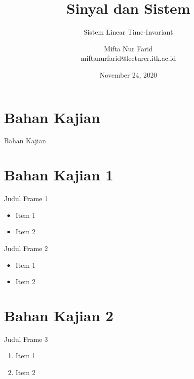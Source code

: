 \documentclass[aspectratio=169]{beamer}
\author{Mifta Nur Farid \\
	miftanurfarid@lecturer.itk.ac.id}
\title{Sinyal dan Sistem}
\subtitle{Sistem Linear Time-Invariant}
\institute{Teknik Elektro \\ Institut Teknologi Kalimantan \\ Balikpapan, Indonesia}
\date{\tiny November 24, 2020}
\begin{document}
\begin{frame}[t,plain]
\titlepage
\end{frame}

\section{Bahan Kajian}
\begin{frame}{Bahan Kajian}
		\tableofcontents[hideallsubsections]
\end{frame}

\section{Bahan Kajian 1}
\begin{frame}{Judul Frame 1}
	\begin{itemize}
		\item Item 1
		\item Item 2
	\end{itemize}
\end{frame}

\begin{frame}{Judul Frame 2}
	\begin{itemize}
		\item Item 1
		\item Item 2
	\end{itemize}
\end{frame}


\section{Bahan Kajian 2}
\begin{frame}{Judul Frame 3}
	\begin{enumerate}
		\item Item 1
		\item Item 2
	\end{enumerate}
\end{frame}
\end{document}
